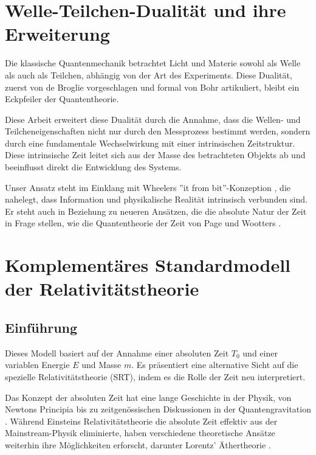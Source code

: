 \documentclass[a4paper,12pt]{article}
\newcommand{\Tzero}{T_0}
\begin{document}
	\section{Welle-Teilchen-Dualität und ihre Erweiterung}
	
	Die klassische Quantenmechanik betrachtet Licht und Materie sowohl als Welle als auch als Teilchen, abhängig von der Art des Experiments. Diese Dualität, zuerst von de Broglie \cite{deBroglie1923} vorgeschlagen und formal von Bohr \cite{Bohr1928} artikuliert, bleibt ein Eckpfeiler der Quantentheorie.
	
	Diese Arbeit erweitert diese Dualität durch die Annahme, dass die Wellen- und Teilcheneigenschaften nicht nur durch den Messprozess bestimmt werden, sondern durch eine fundamentale Wechselwirkung mit einer intrinsischen Zeitstruktur. Diese intrinsische Zeit leitet sich aus der Masse des betrachteten Objekts ab und beeinflusst direkt die Entwicklung des Systems.
	
	Unser Ansatz steht im Einklang mit Wheelers ''it from bit''-Konzeption \cite{Wheeler1990}, die nahelegt, dass Information und physikalische Realität intrinsisch verbunden sind. Er steht auch in Beziehung zu neueren Ansätzen, die die absolute Natur der Zeit in Frage stellen, wie die Quantentheorie der Zeit von Page und Wootters \cite{Page1983}.
	
	\section{Komplementäres Standardmodell der Relativitätstheorie}
	
	\subsection{Einführung}
	Dieses Modell basiert auf der Annahme einer absoluten Zeit $\Tzero$ und einer variablen Energie $E$ und Masse $m$. Es präsentiert eine alternative Sicht auf die spezielle Relativitätstheorie (SRT), indem es die Rolle der Zeit neu interpretiert.
	
	Das Konzept der absoluten Zeit hat eine lange Geschichte in der Physik, von Newtons Principia \cite{Newton1687} bis zu zeitgenössischen Diskussionen in der Quantengravitation \cite{Anderson2010}. Während Einsteins Relativitätstheorie \cite{Einstein1905} die absolute Zeit effektiv aus der Mainstream-Physik eliminierte, haben verschiedene theoretische Ansätze weiterhin ihre Möglichkeiten erforscht, darunter Lorentz' Äthertheorie \cite{Lorentz1904}.
	
\end{document}
